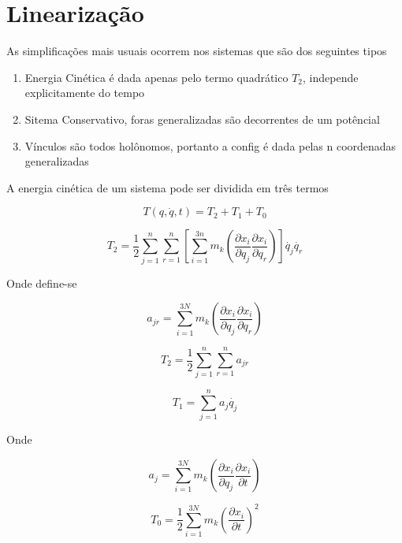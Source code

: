 \section{Linearização}

As simplificações mais usuais ocorrem nos sistemas que são dos seguintes tipos

\begin{enumerate}
	\item Energia Cinética é dada apenas pelo termo quadrático $T_2$, independe explicitamente do tempo
	\item Sitema Conservativo, foras generalizadas são decorrentes de um potêncial
	\item Vínculos são todos holônomos, portanto a config é dada pelas n coordenadas generalizadas
\end{enumerate}

A energia cinética de um sistema pode ser dividida em três termos

$$ T(q, \dot{q}, t) = T_2 + T_1 + T_0 $$

\begin{namedtheorem}[T_2]

$$ T_2 = \frac{1}{2}\sum_{j=1}^n \sum_{r=1}^n [\sum_{i=1}^{3n} m_k(\frac{\partial x_i}{\partial q_j} \frac{\partial x_i}{\partial q_r})] \dot{q_j} \dot{q_r} $$

Onde define-se

$$ a_{jr} = \sum_{i=1}^{3N} m_k(\frac{\partial x_i}{\partial q_j} \frac{\partial x_i}{\partial q_r}) $$

$$T_2 = \frac{1}{2}\sum_{j=1}^n \sum_{r=1}^n a_{jr}  $$

\end{namedtheorem}

\begin{namedtheorem}[T_1 Centrífugo]
$$ T_1 = \sum_{j=1}^n a_j\dot{q_j} $$

Onde

$$ a_j = \sum_{i=1}^{3N} m_k (\frac{\partial x_i}{\partial q_j} \frac{\partial x_i}{\partial t}) $$

\end{namedtheorem}

\begin{namedtheorem}[T_0 Giroscópico]

$$ T_0 = \frac{1}{2} \sum_{i=1}^{3N} m_k (\frac{\partial x_i}{\partial t})^2 $$

\end{namedtheorem}